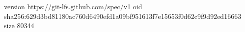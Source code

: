 version https://git-lfs.github.com/spec/v1
oid sha256:629d3bd81180ac760d6490efd1a09bf951613f7e15653f0d62c9f9d92ed16663
size 80344

